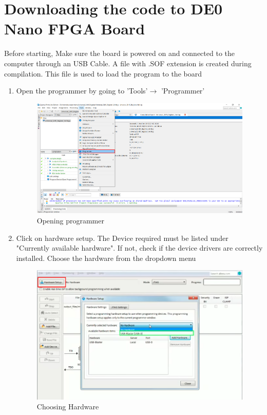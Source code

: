 \documentclass[12pt]{article}
\begin{document}
\section{Downloading the code to DE0 Nano FPGA Board}
 Before starting, Make sure the board is powered on and connected to the computer through an USB Cable. A file with .SOF extension is created during compilation. This file is used to load the program to the board
 
 \begin{enumerate}
     \item Open the programmer by going to 'Tools'$\rightarrow$ 'Programmer'
     \begin{figure}[H]
         \centering
         \includegraphics[width=14cm,keepaspectratio]{usr8.png}
         \caption{Opening programmer}
     \end{figure}
     \newpage
     \item Click on hardware setup. The Device required must be listed under "Currently available hardware". If not, check if the device drivers are correctly installed. Choose the hardware from the dropdown menu
     \begin{figure}[H]
         \centering
         \includegraphics[width=14cm,keepaspectratio]{downloading to board/3.png}
         \caption{Choosing Hardware }


\end{figure}
\end{enumerate}
\end{document}
